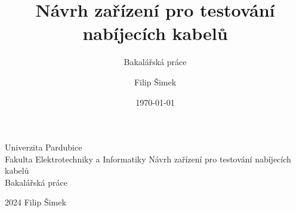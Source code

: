 \documentclass[14pt,a4paper,titlepage]{scrreprt}
\title{Návrh zařízení pro testování nabíjecích kabelů}
\subtitle{Bakalářská práce}
\author{Filip Šimek}
\date{\today}
\begin{document}
	\begin{titlepage}
		\begin{center}
			{Univerzita Pardubice}\\
			{Fakulta Elektrotechniky a Informatiky}
			\vfill
			{Návrh zařízení pro testování nabíjecích kabelů}\\ {Bakalářská práce}
			\vfill
			\end{center}
			{2024} \hfill {Filip Šimek}
\end{titlepage}
\end{document}
